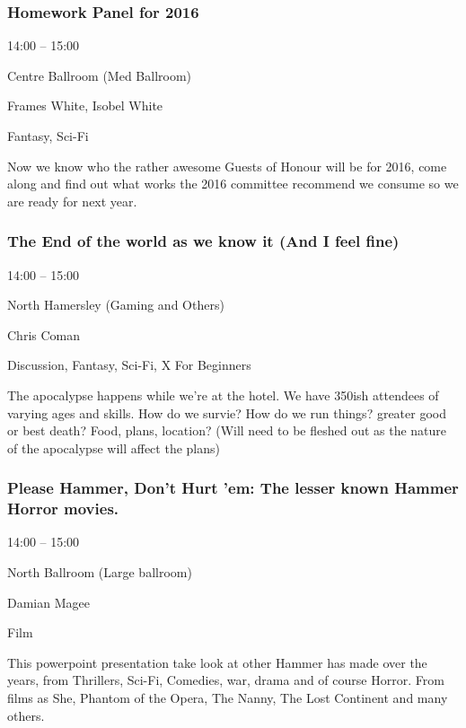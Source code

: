 \documentclass{scrreprt}
\begin{document}
\begin{multicols}{2}
\subsubsection*{Homework Panel for 2016}\begin{description}
\setlength{\itemsep}{0pt}
\setlength{\parsep}{0pt}
\setlength{\parskip}{0pt}
\item[Time:]{14:00 -- 15:00}
\item[Venue:]{Centre Ballroom (Med Ballroom)}
\item[People:]{Frames White, Isobel White}
\item[Tags:]{Fantasy, Sci-Fi}\end{description}
Now we know who the rather awesome Guests of Honour will be for 2016, come along and find out what works the 2016 committee recommend we consume so we are ready for next year.
\subsubsection*{The End of the world as we know it (And I feel fine)}\begin{description}
\setlength{\itemsep}{0pt}
\setlength{\parsep}{0pt}
\setlength{\parskip}{0pt}
\item[Time:]{14:00 -- 15:00}
\item[Venue:]{North Hamersley (Gaming and Others)}
\item[People:]{Chris Coman}
\item[Tags:]{Discussion, Fantasy, Sci-Fi, X For Beginners}\end{description}
The apocalypse happens while we’re at the hotel. We have 350ish attendees of varying ages and skills. How do we survie? How do we run things? greater good or best death? Food, plans, location? (Will need to be fleshed out as the nature of the apocalypse will affect the plans)
\subsubsection*{Please Hammer, Don't Hurt 'em: The lesser known Hammer Horror movies.}\begin{description}
\setlength{\itemsep}{0pt}
\setlength{\parsep}{0pt}
\setlength{\parskip}{0pt}
\item[Time:]{14:00 -- 15:00}
\item[Venue:]{North Ballroom (Large ballroom)}
\item[People:]{Damian Magee}
\item[Tags:]{Film}\end{description}
This powerpoint presentation take look at other Hammer has made over the years, from Thrillers, Sci-Fi, Comedies, war, drama and of course Horror. From films as She, Phantom of the Opera, The Nanny, The Lost Continent and many others.

\end{multicols}
\end{document}
